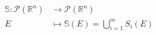 \documentclass[preview]{standalone}
\begin{document}
\begin{center}
\begin{align*}
                \mathbb{S}\colon\mathcal{P}(\mathbb{R}^n)&\rightarrow\mathcal{P}(\mathbb{R}^n)\\
                E&\mapsto \mathbb{S}(E)=\bigcup_{i=1}^m S_i(E)
            \end{align*}
\end{center}
\end{document}
